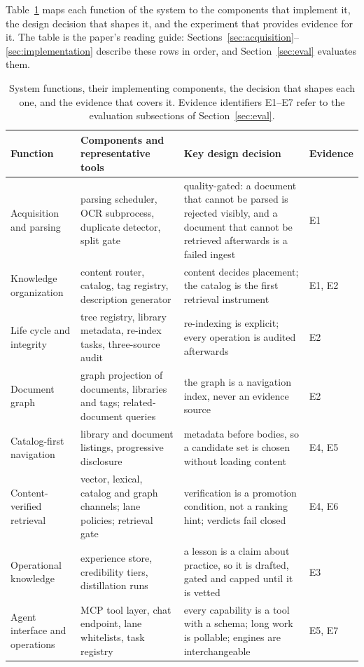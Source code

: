 Table~\ref{tab:modules} maps each function of the system to the components
that implement it, the design decision that shapes it, and the experiment
that provides evidence for it. The table is the paper's reading guide:
Sections~\ref{sec:acquisition}--\ref{sec:implementation} describe these rows
in order, and Section~\ref{sec:eval} evaluates them.

\begin{table}[!htbp]
\centering
\footnotesize
\setlength{\tabcolsep}{3.5pt}
\caption{System functions, their implementing components, the decision that
shapes each one, and the evidence that covers it. Evidence identifiers
E1--E7 refer to the evaluation subsections of Section~\ref{sec:eval}.}
\label{tab:modules}
\begin{tabular}{p{2.6cm}p{4.0cm}p{4.6cm}p{1.9cm}}
\toprule
Function & Components and representative tools & Key design decision & Evidence \\
\midrule
Acquisition and parsing & parsing scheduler, OCR subprocess, duplicate
detector, split gate & quality-gated: a document that cannot be parsed is
rejected visibly, and a document that cannot be retrieved afterwards is a
failed ingest & E1 \\
Knowledge organization & content router, catalog, tag registry, description
generator & content decides placement; the catalog is the first retrieval
instrument & E1, E2 \\
Life cycle and integrity & tree registry, library metadata, re-index tasks,
three-source audit & re-indexing is explicit; every operation is audited
afterwards & E2 \\
Document graph & graph projection of documents, libraries and tags;
related-document queries & the graph is a navigation index, never an evidence
source & E2 \\
Catalog-first navigation & library and document listings, progressive
disclosure & metadata before bodies, so a candidate set is chosen without
loading content & E4, E5 \\
Content-verified retrieval & vector, lexical, catalog and graph channels;
lane policies; retrieval gate & verification is a promotion condition, not a
ranking hint; verdicts fail closed & E4, E6 \\
Operational knowledge & experience store, credibility tiers, distillation
runs & a lesson is a claim about practice, so it is drafted, gated and
capped until it is vetted & E3 \\
Agent interface and operations & MCP tool layer, chat endpoint, lane
whitelists, task registry & every capability is a tool with a schema; long
work is pollable; engines are interchangeable & E5, E7 \\
\bottomrule
\end{tabular}
\end{table}

